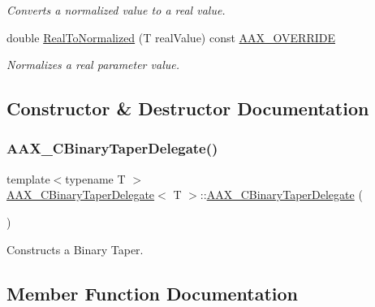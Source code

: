 \begin{DoxyCompactItemize}
\begin{DoxyCompactList}\small\item\em Converts a normalized value to a real value. \end{DoxyCompactList}\item 
double \mbox{\hyperlink{a01457_aa27dfc33b38aef729c4cd499d90317a1}{Real\+To\+Normalized}} (T real\+Value) const \mbox{\hyperlink{a00392_ac2f24a5172689ae684344abdcce55463}{A\+A\+X\+\_\+\+O\+V\+E\+R\+R\+I\+DE}}
\begin{DoxyCompactList}\small\item\em Normalizes a real parameter value. \end{DoxyCompactList}\end{DoxyCompactItemize}


\subsection{Constructor \& Destructor Documentation}
\mbox{\label{a01457_aae24e1f477f843ddb351838931a3e6b5}} 
\subsubsection{\texorpdfstring{AAX\_CBinaryTaperDelegate()}{AAX\_CBinaryTaperDelegate()}}
{\footnotesize\ttfamily template$<$typename T $>$ \\
\mbox{\hyperlink{a01457}{A\+A\+X\+\_\+\+C\+Binary\+Taper\+Delegate}}$<$ T $>$\+::\mbox{\hyperlink{a01457}{A\+A\+X\+\_\+\+C\+Binary\+Taper\+Delegate}} (\begin{DoxyParamCaption}{ }\end{DoxyParamCaption})}



Constructs a Binary Taper. 



\subsection{Member Function Documentation}
\mbox{\label{a01457_a433b33f4b290fe03846b2044014ae994}} 
